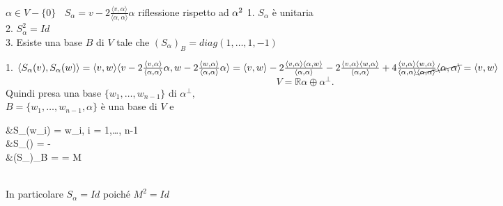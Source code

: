\documentclass[12px]{article}
\begin{document}
	\hline \ \\
$\displaystyle\alpha\in V\minus \{0\}  \ \ \ \ S_\alpha = v-2\frac{ \langle v, \alpha \rangle }{ \langle \alpha,\alpha \rangle} \alpha$ riflessione rispetto ad $\alpha^2\\$
1. $S_\alpha$ è unitaria\\
2. $S_\alpha^2 = Id$\\
3. Esiste una base $B$ di $V$ tale che 
$(S_\alpha)_B = diag(1,\ldots, 1, -1)$
\begin{dimo}
	1. $ \langle S_\alpha (v), S_\alpha (w) \rangle  = \langle v, w \rangle \\
	\langle v -2\frac{ \langle v, \alpha \rangle }{ \langle \alpha,\alpha \rangle} \alpha,w  -2\frac{ \langle w, \alpha \rangle }{ \langle \alpha,\alpha \rangle} \alpha  \rangle  = \\
	\langle v, w \rangle   -2\frac{ \langle v, \alpha \rangle \langle \alpha, w \rangle }{ \langle \alpha,\alpha \rangle} -2\frac{ \langle v, \alpha \rangle \langle w, \alpha \rangle }{ \langle \alpha,\alpha \rangle}  + 4\frac{ \langle v, \alpha \rangle \langle w, \alpha \rangle }{ \langle \alpha,\alpha \rangle \cancel{\langle \alpha, \alpha \rangle} } \cancel{\langle \alpha, \alpha \rangle } = \langle v, w \rangle $\\
	\[
		V = \mathbb{R}\alpha \oplus \alpha^\perp
	.\] 
	Quindi presa una base $\{w_1,\ldots, w_{n-1}\}$ di $\alpha^\perp,$\\
	$B = \{w_1,\ldots,w_{n-1},\alpha\}  $ è una base di $V$ e\\
	\begin{aligned}
		&S_\alpha(w_i) = w_i, i = 1,\ldots, n-1\\
		&S_\alpha(\alpha) = -\alpha\\
		&(S_\alpha)_B =  = M
	\end{aligned}\\
	In particolare $S_\alpha = Id$ poiché $M^2 = Id$
\end{dimo}
\end{document}
